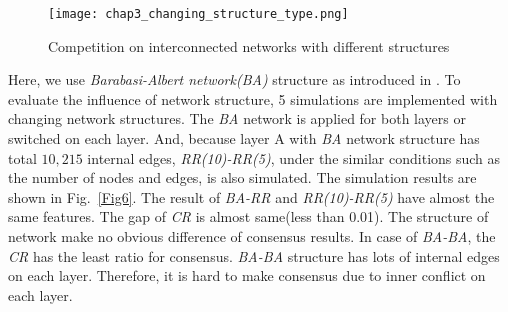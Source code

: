 \begin{figure}[!htb]
	\centering
	\texttt{[image: chap3\_changing\_structure\_type.png]}
	\caption{Competition on interconnected networks with different structures}
	\label{chap3_changing_structure_type}
\end{figure}

Here, we use \textit{Barabasi-Albert network(BA)} structure as introduced in \cite{barabasi1999}. To evaluate the influence of network structure, 5 simulations are implemented with changing network structures. The \textit{BA} network is applied for both layers or switched on each layer. And, because layer A with \textit{BA} network structure has total $10,215$ internal edges, \textit{RR(10)-RR(5)}, under the similar conditions such as the number of nodes and edges, is also simulated. The simulation results are shown in Fig.~\ref{Fig6}. The result of \textit{BA-RR} and \textit{RR(10)-RR(5)} have almost the same features. The gap of \textit{CR} is almost same(less than 0.01). The structure of network make no obvious difference of consensus results. In case of \textit{BA-BA}, the \textit{CR} has the least ratio for consensus. \textit{BA-BA} structure has lots of internal edges on each layer. Therefore, it is hard to make consensus due to inner conflict on each layer. 

